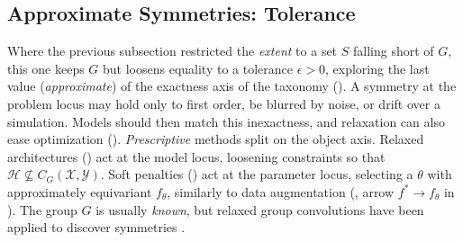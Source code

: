 \documentclass[mathematics,review,submit,moreauthors]{Definitions/mdpi}
\begin{document}
\subsection{Approximate Symmetries: Tolerance}\label{sec:approx-tolerance}
Where the previous subsection restricted the \emph{extent} to a set $S$ falling short of $G$, this one keeps $G$ but loosens equality to a tolerance $\epsilon>0$, exploring the last value (\emph{approximate}) of the exactness axis of the taxonomy ().
A symmetry at the problem locus may hold only to first order, be blurred by noise, or drift over a simulation.
Models should then match this inexactness, and relaxation can also ease optimization ().
\emph{Prescriptive} methods split on the object axis.
Relaxed architectures () act at the model locus, loosening constraints so that $\mathcal{H}\not\subseteq C_G(\mathcal{X},\mathcal{Y})$.
Soft penalties () act at the parameter locus, selecting a $\theta$ with approximately equivariant $f_\theta$, similarly to data augmentation (, arrow $f^*\to f_\theta$ in ).
The group $G$ is usually \emph{known}, but relaxed group convolutions have been applied to discover symmetries \citep{wang2024p4icml}.
\end{document}

